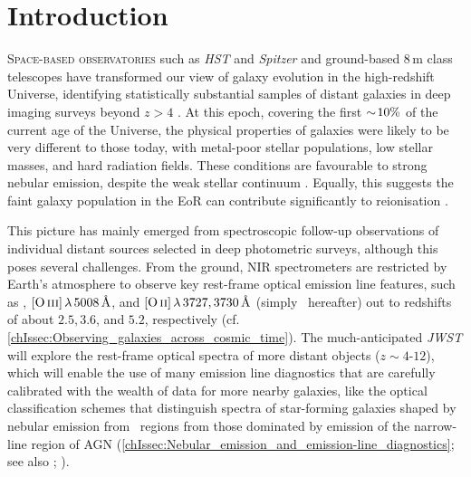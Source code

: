 \newpage

\section{Introduction}
\label{chAsec:Introduction}

\lettrine{S}{pace-based observatories} such as \textit{HST} and \textit{Spitzer} and ground-based $8 \, \mathrm{m}$ class telescopes have transformed our view of galaxy evolution in the high-redshift Universe, identifying statistically substantial samples of distant galaxies in deep imaging surveys beyond $z>4$ \citep{2014ARA&A..52..415M}. At this epoch, covering the first $\sim \! 10\%$ of the current age of the Universe, the physical properties of galaxies were likely to be very different to those today, with metal-poor stellar populations, low stellar masses, and hard radiation fields. These conditions are favourable to strong nebular emission, despite the weak stellar continuum \citep[e.g.][]{2016ARA&A..54..761S}. Equally, this suggests the faint galaxy population in the EoR can contribute significantly to reionisation \citep[e.g.][]{2015ApJ...803...34B}.

This picture has mainly emerged from spectroscopic follow-up observations of individual distant sources selected in deep photometric surveys, although this poses several challenges. From the ground, NIR spectrometers are restricted by Earth's atmosphere to observe key rest-frame optical emission line features, such as \Halpha, $\OIIIf \, \lambda \, 5008 \, \Angstrom$, and $\OII \, \lambda \, 3727, 3730 \, \Angstrom$ (simply \OII\ hereafter) out to redshifts of about $2.5, 3.6$, and $5.2$, respectively (cf. \cref{chIssec:Observing_galaxies_across_cosmic_time}). The much-anticipated \textit{JWST} will explore the rest-frame optical spectra of more distant objects ($z \sim 4$-$12$), which will enable the use of many emission line diagnostics that are carefully calibrated with the wealth of data for more nearby galaxies, like the optical classification schemes that distinguish spectra of star-forming galaxies shaped by nebular emission from \HII\ regions from those dominated by emission of the narrow-line region of AGN (\cref{chIssec:Nebular_emission_and_emission-line_diagnostics}; see also ; \citealt{1987ApJS...63..295V}).

